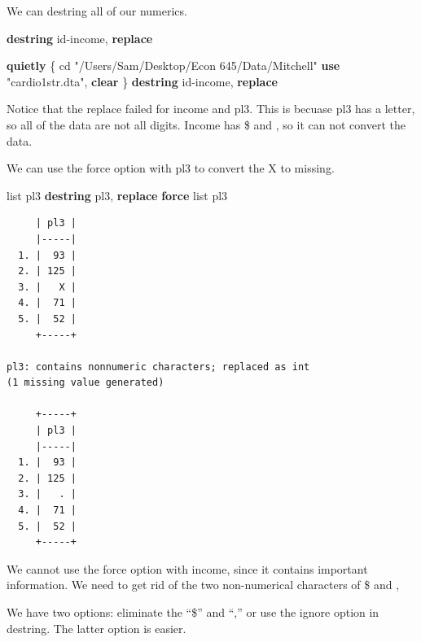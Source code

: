 \documentclass[
]{book}
\newenvironment{Shaded}{\begin{snugshade}}{\end{snugshade}}
\newcommand{\KeywordTok}[1]{\textcolor[rgb]{0.13,0.29,0.53}{\textbf{#1}}}
\newcommand{\NormalTok}[1]{#1}
\newcommand{\OtherTok}[1]{\textcolor[rgb]{0.56,0.35,0.01}{#1}}
\newcommand{\StringTok}[1]{\textcolor[rgb]{0.31,0.60,0.02}{#1}}
\begin{document}
We can destring all of our numerics.

\begin{Shaded}
\begin{Highlighting}[]
\KeywordTok{destring}\NormalTok{ id{-}income, }\KeywordTok{replace}
\end{Highlighting}
\end{Shaded}

\begin{Shaded}
\begin{Highlighting}[]
\KeywordTok{quietly}\NormalTok{ \{}
\NormalTok{cd }\StringTok{"/Users/Sam/Desktop/Econ 645/Data/Mitchell"}
\KeywordTok{use} \StringTok{"cardio1str.dta"}\NormalTok{, }\KeywordTok{clear}
\NormalTok{\}}
\KeywordTok{destring}\NormalTok{ id{-}income, }\KeywordTok{replace}
\end{Highlighting}
\end{Shaded}

Notice that the replace failed for income and pl3. This is becuase pl3 has a letter, so all of the data are not all digits. Income has \$ and , so it can not convert the data.

We can use the force option with pl3 to convert the X to missing.

\begin{Shaded}
\begin{Highlighting}[]
\OtherTok{list}\NormalTok{ pl3}
\KeywordTok{destring}\NormalTok{ pl3, }\KeywordTok{replace} \KeywordTok{force}
\OtherTok{list}\NormalTok{ pl3}
\end{Highlighting}
\end{Shaded}

\begin{verbatim}
     | pl3 |
     |-----|
  1. |  93 |
  2. | 125 |
  3. |   X |
  4. |  71 |
  5. |  52 |
     +-----+

pl3: contains nonnumeric characters; replaced as int
(1 missing value generated)

     +-----+
     | pl3 |
     |-----|
  1. |  93 |
  2. | 125 |
  3. |   . |
  4. |  71 |
  5. |  52 |
     +-----+
\end{verbatim}

We cannot use the force option with income, since it contains important information. We need to get rid of the two non-numerical characters of \$ and ,

We have two options: eliminate the ``\$'' and ``,'' or use the ignore option in destring. The latter option is easier.

\begin{Shaded}
\end{Shaded}
\end{document}
